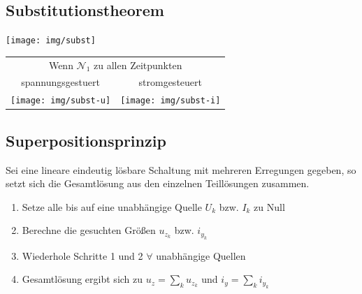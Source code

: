 \documentclass[fs, footer]{latex4ei}
\begin{document}
\begin{multicols*}{4}
	\subsection{Substitutionstheorem}
	\texttt{[image: img/subst]}\\
	\begin{tabular}{cc}
			\multicolumn{2}{c}{Wenn $\mathcal N_1$ zu allen Zeitpunkten}\\
			spannungsgestuert & stromgesteuert\\
		\texttt{[image: img/subst-u]}&
		\texttt{[image: img/subst-i]}
	\end{tabular}

	\subsection{Superpositionsprinzip}
	Sei eine lineare eindeutig lösbare Schaltung mit mehreren Erregungen gegeben, so setzt sich die Gesamtlösung aus den einzelnen Teillösungen zusammen.
	\begin{enumerate}\itemsep0pt
		\item Setze alle bis auf eine unabhängige Quelle $U_k$ bzw. $I_k$ zu Null
		\item Berechne die gesuchten Größen $u_{z_k}$ bzw. $i_{y_k}$
		\item Wiederhole Schritte 1 und 2 $\forall$ unabhängige Quellen
		\item Gesamtlösung ergibt sich zu $u_z = \sum_ku_{z_k}$ und $i_y = \sum_ki_{y_k}$
	\end{enumerate}

	\sectionbox{
}
\end{multicols*}
\end{document}
